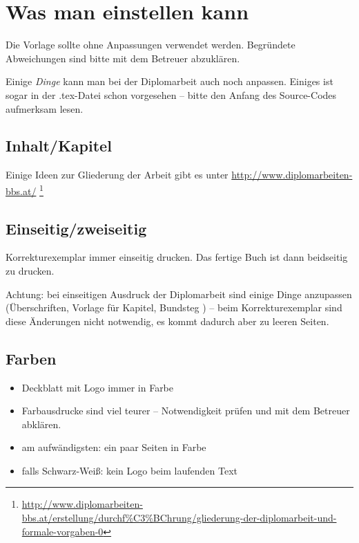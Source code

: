 \hypertarget{was-man-einstellen-kann}{%
\section{Was man einstellen kann}\label{was-man-einstellen-kann}}

Die Vorlage sollte ohne Anpassungen verwendet werden. Begründete
Abweichungen sind bitte mit dem Betreuer abzuklären.

Einige \emph{Dinge} kann man bei der Diplomarbeit auch noch anpassen.
Einiges ist sogar in der .tex-Datei schon vorgesehen -- bitte den Anfang
des Source-Codes aufmerksam lesen.

\hypertarget{inhaltkapitel}{%
\subsection{Inhalt/Kapitel}\label{inhaltkapitel}}

Einige Ideen zur Gliederung der Arbeit gibt es unter
\url{http://www.diplomarbeiten-bbs.at/} \footnote{\url{http://www.diplomarbeiten-bbs.at/erstellung/durchf\%C3\%BChrung/gliederung-der-diplomarbeit-und-formale-vorgaben-0}}

\hypertarget{einseitigzweiseitig}{%
\subsection{Einseitig/zweiseitig}\label{einseitigzweiseitig}}

Korrekturexemplar immer einseitig drucken. Das fertige Buch ist dann
beidseitig zu drucken.

Achtung: bei einseitigen Ausdruck der Diplomarbeit sind einige Dinge
anzupassen (Überschriften, Vorlage für Kapitel, Bundsteg \usw) -- beim
Korrekturexemplar sind diese Änderungen nicht notwendig, es kommt
dadurch aber \zB zu leeren Seiten.

\hypertarget{farben}{%
\subsection{Farben}\label{farben}}

\begin{itemize}
\tightlist
\item
  Deckblatt mit Logo immer in Farbe
\item
  Farbausdrucke sind viel teurer -- Notwendigkeit prüfen und mit dem
  Betreuer abklären.
\item
  am aufwändigsten: ein paar Seiten in Farbe
\item
  falls Schwarz-Weiß: kein Logo beim laufenden Text
\end{itemize}


